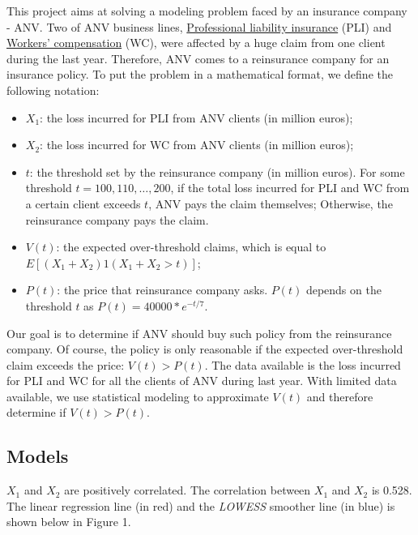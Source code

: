 \documentclass[11pt,]{article}
\begin{document}
This project aims at solving a modeling problem faced by an insurance
company - ANV. Two of ANV business lines,
\href{https://en.wikipedia.org/wiki/Professional_liability_insurance}{Professional
liability insurance} (PLI) and
\href{https://en.wikipedia.org/wiki/Workers\%27_compensation}{Workers'
compensation} (WC), were affected by a huge claim from one client during
the last year. Therefore, ANV comes to a reinsurance company for an
insurance policy. To put the problem in a mathematical format, we define
the following notation:

\begin{itemize}
\item
  \(X_1\): the loss incurred for PLI from ANV clients (in million
  euros);
\item
  \(X_2\): the loss incurred for WC from ANV clients (in million euros);
\item
  \(t\): the threshold set by the reinsurance company (in million
  euros). For some threshold \(t = 100,110,…,200\), if the total loss
  incurred for PLI and WC from a certain client exceeds \(t\), ANV pays
  the claim themselves; Otherwise, the reinsurance company pays the
  claim.
\item
  \(V(t)\): the expected over-threshold claims, which is equal to
  \(E[(X_1+X_2)1(X_1+X_2>t)]\);
\item
  \(P(t)\): the price that reinsurance company asks. \(P(t)\) depends on
  the threshold \(t\) as \(P(t)=40000 * e^{-t/7}\).
\end{itemize}

Our goal is to determine if ANV should buy such policy from the
reinsurance company. Of course, the policy is only reasonable if the
expected over-threshold claim exceeds the price: \(V(t) > P(t)\). The
data available is the loss incurred for PLI and WC for all the clients
of ANV during last year. With limited data available, we use statistical
modeling to approximate \(V(t)\) and therefore determine if
\(V(t) > P(t)\).

\hypertarget{models}{%
\subsection{Models}\label{models}}

\(X_1\) and \(X_2\) are positively correlated. The correlation between
\(X_1\) and \(X_2\) is 0.528. The linear regression line (in red) and
the \emph{LOWESS} smoother line (in blue) is shown below in Figure 1.
\end{document}
